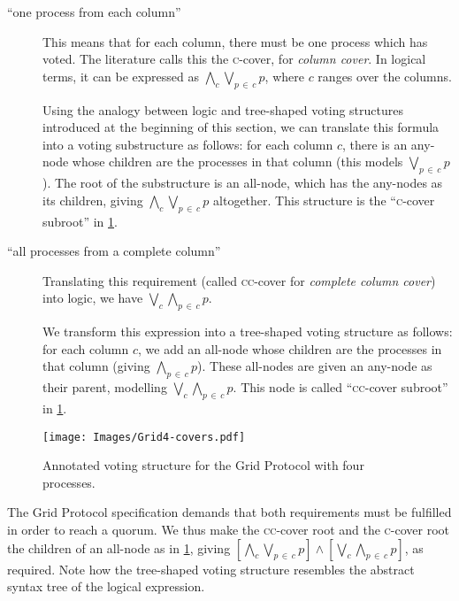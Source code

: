\documentclass[12pt,chapterprefix=true,toc=bibliography,numbers=noendperiod,
               footnotes=multiple,twoside]{scrreprt}
\begin{document}
\begin{description}
    \item[\enquote{one process from each column}] This means that for each column, there must be one process which has voted. The literature calls this the \textsc{c}-cover, for \emph{column cover}. In logical terms, it can be expressed as \(\bigwedge_c \bigvee_{p\,\in\,c} p \), where \(c\) ranges over the columns.

        Using the analogy between logic and tree-shaped voting structures introduced at the beginning of this section, we can translate this formula into a voting substructure as follows: for each column \(c\), there is an any-node whose children are the processes in that column (this models \(\bigvee_{p\,\in\,c} p \)). The root of the substructure is an all-node, which has the any-nodes as its children, giving \(\bigwedge_c \bigvee_{p\,\in\,c} p \) altogether. This structure is the \enquote{\textsc{c}-cover subroot} in \cref{fig:grid4-covers}.

    \item[\enquote{all processes from a complete column}] Translating this requirement (called \textsc{cc}-cover for \emph{complete column cover}) into logic, we have \(\bigvee_c \bigwedge_{p\,\in\,c} p \).

        We transform this expression into a tree-shaped voting structure as follows: for each column \(c\), we add an all-node whose children are the processes in that column (giving \(\bigwedge_{p\,\in\,c} p \)). These all-nodes are given an any-node as their parent, modelling \(\bigvee_c \bigwedge_{p\,\in\,c} p \). This node is called \enquote{\textsc{cc}-cover subroot} in \cref{fig:grid4-covers}.
\end{description}

\begin{figure}[h]
    \centering
    \texttt{[image: Images/Grid4-covers.pdf]}
    \caption{Annotated voting structure for the Grid Protocol with four processes.}
    \label{fig:grid4-covers}
\end{figure}

The Grid Protocol specification demands that both requirements must be fulfilled in order to reach a quorum. We thus make the \textsc{cc}-cover root and the \textsc{c}-cover root the children of an all-node as in \cref{fig:grid4-covers}, giving \( \left[ \bigwedge_c \bigvee_{p\,\in\,c} p \right] \wedge \left[ \bigvee_c \bigwedge_{p\,\in\,c} p \right] \), as required. Note how the tree-shaped voting structure resembles the abstract syntax tree of the logical expression.
\end{document}
